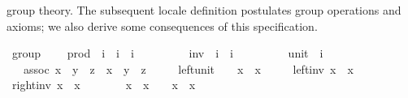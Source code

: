 \begin{isabellebody}
\begin{isamarkuptext}
  group theory.  The subsequent locale definition postulates group
  operations and axioms; we also derive some consequences of this
  specification.%
\end{isamarkuptext}%
\isamarkuptrue%
\isamarkupfalse%
\ group\ {\isacharequal}\isanewline
\ \ \ prod\ {\isacharcolon}{\isacharcolon}\ {\isachardoublequoteopen}i\ {\isasymRightarrow}\ i\ {\isasymRightarrow}\ i{\isachardoublequoteclose}\ \ {\isacharparenleft}\ {\isachardoublequoteopen}{\isasymcirc}{\isachardoublequoteclose}\ {}{}{\isacharparenright}\isanewline
\ \ \ \ \ inv\ {\isacharcolon}{\isacharcolon}\ {\isachardoublequoteopen}i\ {\isasymRightarrow}\ i{\isachardoublequoteclose}\ \ {\isacharparenleft}{\isachardoublequoteopen}{\isacharparenleft}{\isacharunderscore}{\isasyminverse}{\isacharparenright}{\isachardoublequoteclose}\ {\isacharbrackleft}{}{}{}{}{\isacharbrackright}\ {}{}{}{\isacharparenright}\isanewline
\ \ \ \ \ unit\ {\isacharcolon}{\isacharcolon}\ i\ \ {\isacharparenleft}{\isachardoublequoteopen}{}{\isachardoublequoteclose}{\isacharparenright}\isanewline
\ \ \ assoc{\isacharcolon}\ {\isachardoublequoteopen}{\isacharparenleft}x\ {\isasymcirc}\ y{\isacharparenright}\ {\isasymcirc}\ z\ {\isacharequal}\ x\ {\isasymcirc}\ {\isacharparenleft}y\ {\isasymcirc}\ z{\isacharparenright}{\isachardoublequoteclose}\isanewline
\ \ \ \ \ left{\isacharunderscore}unit{\isacharcolon}\ \ {\isachardoublequoteopen}{}\ {\isasymcirc}\ x\ {\isacharequal}\ x{\isachardoublequoteclose}\isanewline
\ \ \ \ \ left{\isacharunderscore}inv{\isacharcolon}\ {\isachardoublequoteopen}x{\isasyminverse}\ {\isasymcirc}\ x\ {\isacharequal}\ {}{\isachardoublequoteclose}\isanewline
{}\isanewline
\isanewline
{}\isamarkupfalse%
\ right{\isacharunderscore}inv{\isacharcolon}\ {\isachardoublequoteopen}x\ {\isasymcirc}\ x{\isasyminverse}\ {\isacharequal}\ {}{\isachardoublequoteclose}\isanewline
%
\isadelimproof
%
\endisadelimproof
%
\isatagproof
{}\isamarkupfalse%
\ {\isacharminus}\isanewline
\ \ \isamarkupfalse%
\ {\isachardoublequoteopen}x\ {\isasymcirc}\ x{\isasyminverse}\ {\isacharequal}\ {}\ {\isasymcirc}\ {\isacharparenleft}x\ {\isasymcirc}\ x{\isasyminverse}{\isacharparenright}{\isachardoublequoteclose}\ \isamarkupfalse%

\end{isabellebody}

